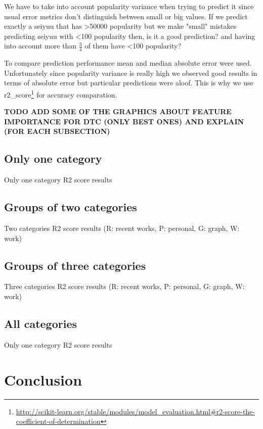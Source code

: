 We have to take into account popularity variance when trying to predict it since usual error metrics don't distinguish between small or big values. If we predict exactly a seiyuu that has \textgreater50000 popularity but we make "small" mistakes predicting seiyuu with \textless100 popularity then, is it a good prediction? and having into account more than $\frac{3}{4}$ of them have \textless100 popularity?

To compare prediction performance mean and median absolute error were used. Unfortunately since popularity variance is really high we observed good results in terms of absolute error but particular predictions were aloof. This is why we use r2\_score\footnote{\url{http://scikit-learn.org/stable/modules/model_evaluation.html#r2-score-the-coefficient-of-determination}} for accuracy comparation. 

\textbf{TODO ADD SOME OF THE GRAPHICS ABOUT FEATURE IMPORTANCE FOR DTC (ONLY BEST ONES) AND EXPLAIN (FOR EACH SUBSECTION)}

\FloatBarrier
\subsection{Only one category}
\begin{table}[!hbt]
	\begin{center}
	\caption{Only one category R2 score results}
	\label{tab:oneCategory}
	
	\end{center}
\end{table}

\FloatBarrier
\subsection{Groups of two categories}
\begin{table}[!hbt]
	\begin{center}
	\caption{Two categories R2 score results (R: recent works, P: personal, G: graph, W: work)}
	\label{tab:twoCategories}
	
	\end{center}
\end{table}

\FloatBarrier
\subsection{Groups of three categories}
\begin{table}[!hbt]
	\begin{center}
	\caption{Three categories R2 score results (R: recent works, P: personal, G: graph, W: work)}
	\label{tab:threeCategories}
	
	\end{center}
\end{table}

\FloatBarrier
\subsection{All categories}
\begin{table}[!hbt]
	\begin{center}
	\caption{Only one category R2 score results}
	\label{tab:allCategories}
	
	\end{center}
\end{table}

\section{Conclusion}
